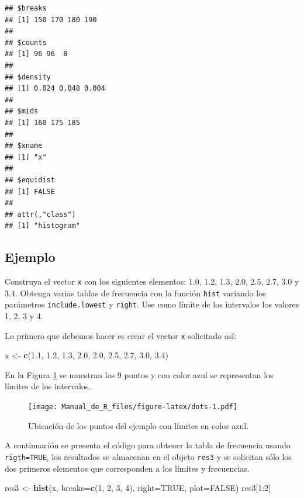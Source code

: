 \documentclass[10pt,]{krantz}
\makeatletter
\newenvironment{Shaded}{\begin{snugshade}}{\end{snugshade}}
\newcommand{\KeywordTok}[1]{\textcolor[rgb]{0.13,0.29,0.53}{\textbf{{#1}}}}
\newcommand{\DataTypeTok}[1]{\textcolor[rgb]{0.13,0.29,0.53}{{#1}}}
\newcommand{\DecValTok}[1]{\textcolor[rgb]{0.00,0.00,0.81}{{#1}}}
\newcommand{\FloatTok}[1]{\textcolor[rgb]{0.00,0.00,0.81}{{#1}}}
\newcommand{\StringTok}[1]{\textcolor[rgb]{0.31,0.60,0.02}{{#1}}}
\newcommand{\OtherTok}[1]{\textcolor[rgb]{0.56,0.35,0.01}{{#1}}}
\newcommand{\NormalTok}[1]{{#1}}
\newenvironment{kframe}{%
\medskip{}
\setlength{\fboxsep}{.8em}
 \def\at@end@of@kframe{}%
 \ifinner\ifhmode%
  \def\at@end@of@kframe{\end{minipage}}%
  \begin{minipage}{\columnwidth}%
 \fi\fi%
 \def\FrameCommand##1{\hskip\@totalleftmargin \hskip-\fboxsep
 \colorbox{shadecolor}{##1}\hskip-\fboxsep
     \hskip-\linewidth \hskip-\@totalleftmargin \hskip\columnwidth}%
 \MakeFramed {\advance\hsize-\width
   \@totalleftmargin\z@ \linewidth\hsize
   \@setminipage}}%
 {\par\unskip\endMakeFramed%
 \at@end@of@kframe}
\renewenvironment{Shaded}{\begin{kframe}}{\end{kframe}}
\makeatother
\begin{document}
\begin{verbatim}
## $breaks
## [1] 150 170 180 190
## 
## $counts
## [1] 96 96  8
## 
## $density
## [1] 0.024 0.048 0.004
## 
## $mids
## [1] 160 175 185
## 
## $xname
## [1] "x"
## 
## $equidist
## [1] FALSE
## 
## attr(,"class")
## [1] "histogram"
\end{verbatim}

\subsection*{Ejemplo}\label{ejemplo-29}


Construya el vector \texttt{x} con los siguientes elementos: 1.0, 1.2,
1.3, 2.0, 2.5, 2.7, 3.0 y 3.4. Obtenga varias tablas de frecuencia con
la función \texttt{hist} variando los parámetros \texttt{include.lowest}
y \texttt{right}. Use como límite de los intervalos los valores 1, 2, 3
y 4.

Lo primero que debemos hacer es crear el vector \texttt{x} solicitado
así:

\begin{Shaded}
\begin{Highlighting}[]
\NormalTok{x <-}\StringTok{ }\KeywordTok{c}\NormalTok{(}\FloatTok{1.1}\NormalTok{, }\FloatTok{1.2}\NormalTok{, }\FloatTok{1.3}\NormalTok{, }\FloatTok{2.0}\NormalTok{, }\FloatTok{2.0}\NormalTok{, }\FloatTok{2.5}\NormalTok{, }\FloatTok{2.7}\NormalTok{, }\FloatTok{3.0}\NormalTok{, }\FloatTok{3.4}\NormalTok{)}
\end{Highlighting}
\end{Shaded}

En la Figura \ref{fig:dots} se muestran los 9 puntos y con color azul se
representan los límites de los intervalos.

\begin{figure}[htbp]
\centering
\texttt{[image: Manual\_de\_R\_files/figure-latex/dots-1.pdf]}
\caption{\label{fig:dots}Ubicación de los puntos del ejemplo con límites en
color azul.}
\end{figure}

A continuación se presenta el código para obtener la tabla de frecuencia
usando \texttt{rigth=TRUE}, los resultados se almacenan en el objeto
\texttt{res3} y se solicitan sólo los dos primeros elementos que
corresponden a los límites y frecuencias.

\begin{Shaded}
\begin{Highlighting}[]
\NormalTok{res3 <-}\StringTok{ }\KeywordTok{hist}\NormalTok{(x, }\DataTypeTok{breaks=}\KeywordTok{c}\NormalTok{(}\DecValTok{1}\NormalTok{, }\DecValTok{2}\NormalTok{, }\DecValTok{3}\NormalTok{, }\DecValTok{4}\NormalTok{), }\DataTypeTok{right=}\OtherTok{TRUE}\NormalTok{, }\DataTypeTok{plot=}\OtherTok{FALSE}\NormalTok{)}
\NormalTok{res3[}\DecValTok{1}\NormalTok{:}\DecValTok{2}\NormalTok{]}
\end{Highlighting}
\end{Shaded}
\end{document}
